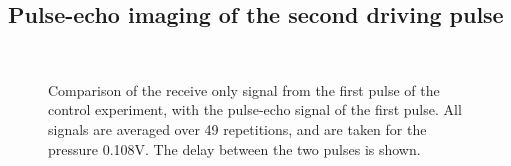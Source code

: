 \subsection{Pulse-echo imaging of the second driving pulse}




\begin{figure}[t]%
  \centering
  \subfloat[2nd pulse - 150]{
    \label{fig:2nd:av:time:150:comp:control:c2nd}
    }
 \quad
  \subfloat[2nd pulse - 150]{
    \label{fig:2nd:av:time:150:comp:control:i2nd}
    }\\
  \subfloat[2nd pulse - 250]{
    \label{fig:2nd:av:time:250:comp:control:c2nd}
    }
 \quad
  \subfloat[2nd pulse - 250]{
    \label{fig:2nd:av:time:250:comp:control:i2nd}
    }
\caption{
    Comparison of the  receive only signal from the first pulse of the control experiment,
    with the pulse-echo signal of the first pulse.
    All signals are averaged over 49 repetitions, and are taken for the pressure 0.108V.
    The delay between the two pulses is shown.
  }
  \label{fig:2nd:av:time:comp:control}
\end{figure}




